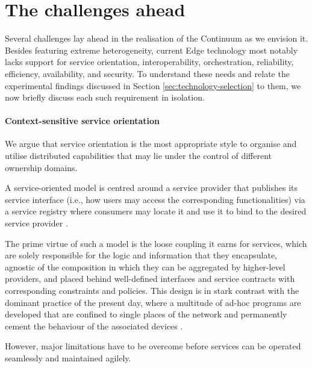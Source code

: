 \section{The challenges ahead}
\label{sec:challenges}

Several challenges lay ahead in the realisation of the Continuum as we envision it. 
Besides featuring extreme heterogeneity, current Edge technology most notably lacks support for service orientation, interoperability, orchestration, reliability, efficiency, availability, and security.
To understand these needs and relate the experimental findings discussed in Section \ref{sec:technology-selection} to them, we now briefly discuss each such requirement in isolation. 

\paragraph{Context-sensitive service orientation}
We argue that service orientation is the most appropriate style to organise and utilise distributed capabilities that may lie under the control of different ownership domains. 

A service-oriented model is centred around a service provider that publishes its service interface (i.e., how users may access the corresponding functionalities) via a service registry where consumers may locate it and use it to bind to the desired service provider \cite{haller2008internet}.

The prime virtue of such a model is the loose coupling it earns for services, which are solely responsible for the logic and information that they encapsulate, agnostic of the composition in which they can be aggregated by higher-level providers, and placed behind well-defined interfaces and service contracts with corresponding constraints and policies.
This design is in stark contrast with the dominant practice of the present day, where a multitude of ad-hoc programs are developed that are confined to single places of the network and permanently cement the behaviour of the associated devices \cite{beckman2020harnessing}.

However, major limitations have to be overcome before services can be operated seamlessly and maintained agilely.  

